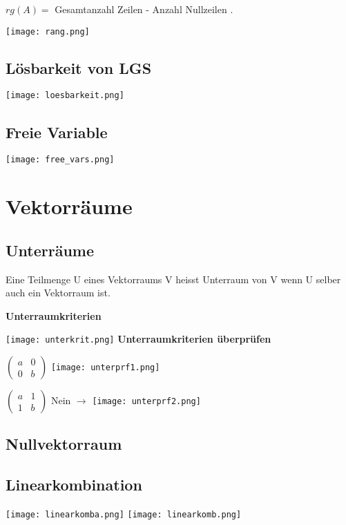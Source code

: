\begin{multicols*}{3}
    {$rg(A) = $ Gesamtanzahl Zeilen - Anzahl Nullzeilen .}

    \texttt{[image: rang.png]}

    \subsection{Lösbarkeit von LGS}

    \texttt{[image: loesbarkeit.png]}

    \subsection{Freie Variable}

    \texttt{[image: free\_vars.png]}


    \section{Vektorräume}

    \subsection{Unterräume}
    {Eine Teilmenge U eines Vektorraums V heisst Unterraum von V wenn U selber auch ein Vektorraum ist.}

    {\textbf{Unterraumkriterien}}

    \texttt{[image: unterkrit.png]}
    {\textbf{Unterraumkriterien überprüfen} }

    {$ \begin{pmatrix}
                a & 0 \\
                0 & b
            \end{pmatrix} $
        \texttt{[image: unterprf1.png]}}

    {$ \begin{pmatrix}
                a & 1 \\
                1 & b
            \end{pmatrix} $
        {Nein $\rightarrow$}
        \texttt{[image: unterprf2.png]}}





    \subsection{Nullvektorraum}

    \subsection{Linearkombination}
    {\texttt{[image: linearkomba.png]}}
    {\texttt{[image: linearkomb.png]}}

\end{multicols*}
